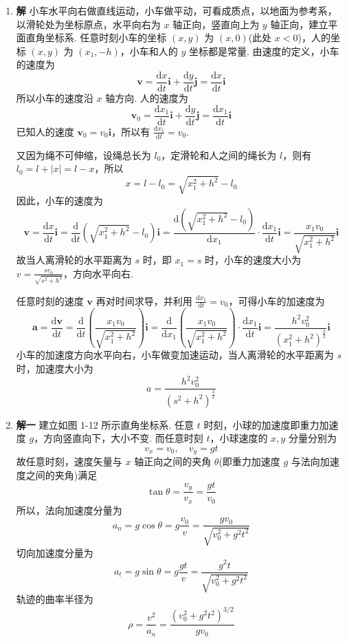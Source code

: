 \begin{enumerate}

\item[L1-2]

\textbf{解} \quad 小车水平向右做直线运动，小车做平动，可看成质点，以地面为参考系，以滑轮处为坐标原点，水平向右为 $x$ 轴正向，竖直向上为 $y$ 轴正向，建立平面直角坐标系. 任意时刻小车的坐标 $(x, y)$ 为 $(x, 0)$(此处 $x < 0$)，人的坐标 $(x, y)$ 为 $(x_1, -h)$，小车和人的 $y$ 坐标都是常量. 由速度的定义，小车的速度为
\[
\boldsymbol{v} = \frac{\mathrm{d}x}{\mathrm{d}t}\boldsymbol{i} + \frac{\mathrm{d}y}{\mathrm{d}t}\boldsymbol{j} = \frac{\mathrm{d}x}{\mathrm{d}t}\boldsymbol{i}
\]
所以小车的速度沿 $x$ 轴方向. 人的速度为
\[
\boldsymbol{v}_0 = \frac{\mathrm{d}x_1}{\mathrm{d}t}\boldsymbol{i} + \frac{\mathrm{d}y}{\mathrm{d}t}\boldsymbol{j} = \frac{\mathrm{d}x_1}{\mathrm{d}t}\boldsymbol{i}
\]
已知人的速度 $\boldsymbol{v}_0 = v_0\boldsymbol{i}$，所以有 $\frac{\mathrm{d}x_1}{\mathrm{d}t} = v_0$.

又因为绳不可伸缩，设绳总长为 $l_0$，定滑轮和人之间的绳长为 $l$，则有 $l_0 = l + |x| = l - x$，所以
\[
x = l - l_0 = \sqrt{x_1^2 + h^2} - l_0
\]
因此，小车的速度为
\[
\boldsymbol{v} = \frac{\mathrm{d}x}{\mathrm{d}t}\boldsymbol{i} = \frac{\mathrm{d}}{\mathrm{d}t}\left(\sqrt{x_1^2 + h^2} - l_0\right)\boldsymbol{i} = \frac{\mathrm{d}\left(\sqrt{x_1^2 + h^2} - l_0\right)}{\mathrm{d}x_1} \cdot \frac{\mathrm{d}x_1}{\mathrm{d}t}\boldsymbol{i} = \frac{x_1 v_0}{\sqrt{x_1^2 + h^2}}\boldsymbol{i}
\]
故当人离滑轮的水平距离为 $s$ 时，即 $x_1 = s$ 时，小车的速度大小为 $v = \frac{s v_0}{\sqrt{s^2 + h^2}}$，方向水平向右.

任意时刻的速度 $\boldsymbol{v}$ 再对时间求导，并利用 $\frac{\mathrm{d}x_1}{\mathrm{d}t} = v_0$，可得小车的加速度为
\[
\boldsymbol{a} = \frac{\mathrm{d}\boldsymbol{v}}{\mathrm{d}t} = \frac{\mathrm{d}}{\mathrm{d}t}\left( \frac{x_1 v_0}{\sqrt{x_1^2 + h^2}} \right)\boldsymbol{i} = \frac{\mathrm{d}}{\mathrm{d}x_1}\left( \frac{x_1 v_0}{\sqrt{x_1^2 + h^2}} \right) \cdot \frac{\mathrm{d}x_1}{\mathrm{d}t}\boldsymbol{i} = \frac{h^2 v_0^2}{\left(x_1^2 + h^2\right)^{\frac{3}{2}}}\boldsymbol{i}
\]
小车的加速度方向水平向右，小车做变加速运动，当人离滑轮的水平距离为 $s$ 时，加速度大小为
\[
a = \frac{h^2 v_0^2}{\left(s^2 + h^2\right)^{\frac{3}{2}}}
\]

\item[L1-3]

\textbf{解一} \quad 建立如图 1-12 所示直角坐标系. 任意 $t$ 时刻，小球的加速度即重力加速度 $g$，方向竖直向下，大小不变. 而任意时刻 $t$，小球速度的 $x, y$ 分量分别为
\[
v_x = v_0, \quad v_y = gt
\]
故任意时刻，速度矢量与 $x$ 轴正向之间的夹角 $\theta$(即重力加速度 $g$ 与法向加速度之间的夹角)满足
\[
\tan \theta = \frac{v_y}{v_x} = \frac{gt}{v_0}
\]
所以，法向加速度分量为
\[
a_n = g \cos \theta = g \frac{v_0}{v} = \frac{g v_0}{\sqrt{v_0^2 + g^2 t^2}}
\]
切向加速度分量为
\[
a_t = g \sin \theta = g \frac{gt}{v} = \frac{g^2 t}{\sqrt{v_0^2 + g^2 t^2}}
\]
轨迹的曲率半径为
\[
\rho = \frac{v^2}{a_n} = \frac{\left(v_0^2 + g^2 t^2\right)^{3/2}}{g v_0}
\]


\end{enumerate}
